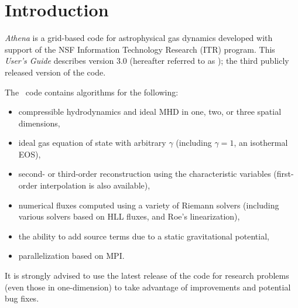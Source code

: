 \section{Introduction}

{\it Athena} is a grid-based code for astrophysical gas dynamics
developed with support of the NSF Information Technology Research (ITR)
program.  This {\it User's Guide} describes version 3.0 (hereafter
referred to as \ath); the third publicly released version of the code.

The \ath\ code contains algorithms for the following:
\begin{itemize}

\item compressible hydrodynamics and ideal MHD in one, two, or three spatial dimensions,

\item ideal gas equation of state with arbitrary $\gamma$ (including 
$\gamma = 1$, an isothermal EOS),

\item second- or third-order reconstruction using the characteristic variables
(first-order interpolation is also available),

\item numerical fluxes computed using a variety of Riemann solvers (including
various solvers based on HLL fluxes, and Roe's linearization),

\item the ability to add source terms due to a static gravitational potential,

\item parallelization based on MPI.

\end{itemize}
It is strongly advised to use the latest release of
the code for research problems (even those in one-dimension) to take
advantage of improvements and potential bug fixes.

